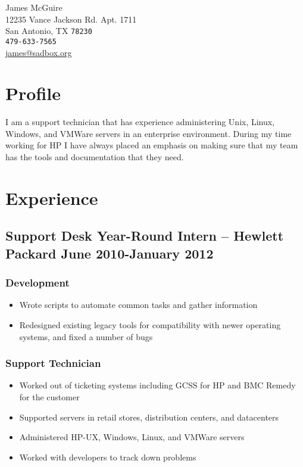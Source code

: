 \documentclass[10pt]{article}
\begin{document}
{\LARGE James McGuire}\\[0.5cm]
12235 Vance Jackson Rd. Apt. 1711\\
San Antonio, TX \texttt{78230}\\[.2cm]
\texttt{479-633-7565}\\
\href{mailto:james@sadbox.org}{james@sadbox.org}\\

\section*{Profile}
I am a support technician that has experience administering Unix, Linux,
Windows, and VMWare servers in an enterprise environment. During my time
working for HP I have always placed an emphasis on making sure that my team has the tools and documentation that
they need.

\section*{Experience}
\subsection*{Support Desk Year-Round Intern -- Hewlett Packard  \hfill June 2010-January 2012}
\subsubsection*{Development}
\begin{itemize}
    \item Wrote scripts to automate common tasks and gather information
    \item Redesigned existing legacy tools for compatibility with newer operating systems, and fixed a number of bugs
\end{itemize}

\subsubsection*{Support Technician}
\begin{itemize}
    \item Worked out of ticketing systems including GCSS for HP and BMC Remedy for the customer
    \item Supported servers in retail stores, distribution centers, and datacenters
    \item Administered HP-UX, Windows, Linux, and VMWare servers
    \item Worked with developers to track down problems
\end{itemize}
\end{document}
